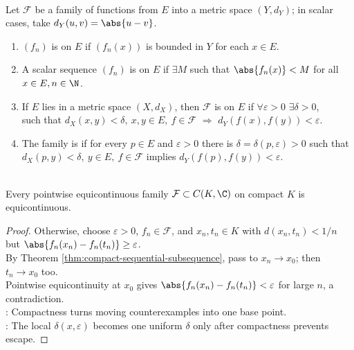\begin{definition} \label{def:pointwise-uniform-bounded-equicontinuous} \\
Let $\mathcal{F}$ be a family of functions from $E$ into a metric space $(Y,d_Y)$; in scalar cases, take $d_Y(u,v)=\abs{u-v}$.
\begin{enumerate}[label=(\roman*)]
\setlength{\itemsep}{0pt}
\item $(f_n)$ is  on $E$ if $(f_n(x))$ is bounded in $Y$ for each $x\in E$.
\item A scalar sequence $(f_n)$ is  on $E$ if $\exists M$ such that $\abs{f_n(x)}<M$ for all $x\in E,n\in\N$.
\item If $E$ lies in a metric space $(X,d_X)$, then $\mathcal{F}$ is  on $E$ if $\forall\varepsilon>0$ $\exists\delta>0$,\\
such that $d_X(x,y)<\delta,\ x,y\in E,\ f\in\mathcal{F}$ $\Longrightarrow$ $d_Y(f(x),f(y))<\varepsilon$.
\item The family is  if for every $p\in E$ and $\varepsilon>0$ there is $\delta=\delta(p,\varepsilon)>0$ such that $d_X(p,y)<\delta,\ y\in E,\ f\in\mathcal{F}$ implies $d_Y(f(p),f(y))<\varepsilon$.
\end{enumerate}
\end{definition}

\begin{theorem} \label{thm:pointwise-equicontinuity-compact-uniform} \\
Every pointwise equicontinuous family $\mathcal{F}\subset C(K,\C)$ on compact $K$ is equicontinuous.
\begin{proof}
Otherwise, choose $\varepsilon>0$, $f_n\in\mathcal{F}$, and $x_n,t_n\in K$ with $d(x_n,t_n)<1/n$ but $\abs{f_n(x_n)-f_n(t_n)}\geq\varepsilon$.\\
By Theorem \ref{thm:compact-sequential-subsequence}, pass to $x_n\to x_0$; then $t_n\to x_0$ too.\\
Pointwise equicontinuity at $x_0$ gives $\abs{f_n(x_n)-f_n(t_n)}<\varepsilon$ for large $n$, a contradiction.\\
: Compactness turns moving counterexamples into one base point.\\
: The local $\delta(x,\varepsilon)$ becomes one uniform $\delta$ only after compactness prevents escape.
\end{proof}
\end{theorem}

